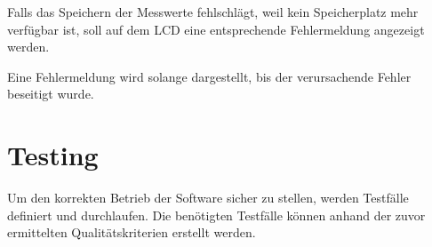 \documentclass[
    10pt,
    a4paper,
]{scrartcl}
\begin{document}
Falls das Speichern der Messwerte fehlschlägt, weil kein Speicherplatz mehr verfügbar ist,
soll auf dem LCD eine entsprechende Fehlermeldung angezeigt werden.

Eine Fehlermeldung wird solange dargestellt, bis der verursachende Fehler beseitigt wurde.

\section{Testing}

Um den korrekten Betrieb der Software sicher zu stellen, werden Testfälle definiert und
durchlaufen. Die benötigten Testfälle können anhand der zuvor ermittelten
Qualitätskriterien erstellt werden.



\listoffigures




\end{document}
